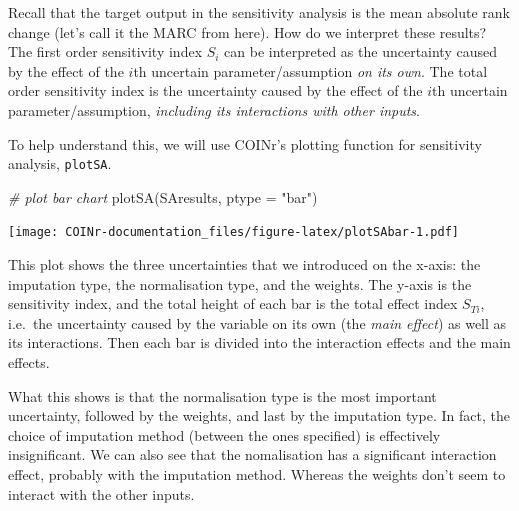 \documentclass[
]{book}
\newenvironment{Shaded}{\begin{snugshade}}{\end{snugshade}}
\newcommand{\AttributeTok}[1]{\textcolor[rgb]{0.77,0.63,0.00}{#1}}
\newcommand{\CommentTok}[1]{\textcolor[rgb]{0.56,0.35,0.01}{\textit{#1}}}
\newcommand{\DocumentationTok}[1]{\textcolor[rgb]{0.56,0.35,0.01}{\textbf{\textit{#1}}}}
\newcommand{\FunctionTok}[1]{\textcolor[rgb]{0.00,0.00,0.00}{#1}}
\newcommand{\NormalTok}[1]{#1}
\newcommand{\SpecialCharTok}[1]{\textcolor[rgb]{0.00,0.00,0.00}{#1}}
\newcommand{\StringTok}[1]{\textcolor[rgb]{0.31,0.60,0.02}{#1}}
\begin{document}
\begin{Shaded}
\end{Shaded}

Recall that the target output in the sensitivity analysis is the mean absolute rank change (let's call it the MARC from here). How do we interpret these results? The first order sensitivity index \(S_i\) can be interpreted as the uncertainty caused by the effect of the \(i\)th uncertain parameter/assumption \emph{on its own}. The total order sensitivity index is the uncertainty caused by the effect of the \(i\)th uncertain parameter/assumption, \emph{including its interactions with other inputs}.

To help understand this, we will use COINr's plotting function for sensitivity analysis, \texttt{plotSA}.

\begin{Shaded}
\begin{Highlighting}[]
\CommentTok{\# plot bar chart}
\FunctionTok{plotSA}\NormalTok{(SAresults, }\AttributeTok{ptype =} \StringTok{"bar"}\NormalTok{)}
\end{Highlighting}
\end{Shaded}

\texttt{[image: COINr-documentation\_files/figure-latex/plotSAbar-1.pdf]}

This plot shows the three uncertainties that we introduced on the x-axis: the imputation type, the normalisation type, and the weights. The y-axis is the sensitivity index, and the total height of each bar is the total effect index \(S_{Ti}\), i.e.~the uncertainty caused by the variable on its own (the \emph{main effect}) as well as its interactions. Then each bar is divided into the interaction effects and the main effects.

What this shows is that the normalisation type is the most important uncertainty, followed by the weights, and last by the imputation type. In fact, the choice of imputation method (between the ones specified) is effectively insignificant. We can also see that the nomalisation has a significant interaction effect, probably with the imputation method. Whereas the weights don't seem to interact with the other inputs.
\end{document}
